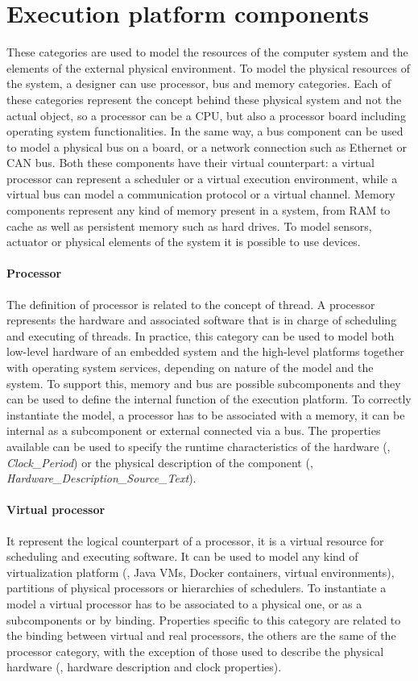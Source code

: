 \section{Execution platform components}
These categories are used to model the resources of the computer system and the elements of the external physical environment. To model the physical resources of the system, a designer can use processor,  bus and memory categories. Each of these categories represent the concept behind these physical system and not the actual object, so a processor can be a CPU, but also a processor board including operating system functionalities. In the same way, a bus component can be used to model a physical bus on a board, or a network connection such as Ethernet or CAN bus. Both these components have their virtual counterpart: a virtual processor can represent a scheduler or a virtual execution environment, while a virtual bus can model a communication protocol or a virtual channel. Memory components represent any kind of memory present in a system, from RAM to cache as well as persistent memory such as hard drives. To model sensors, actuator or physical elements of the system it is possible to use devices.

\paragraph{Processor} The definition of processor is related to the concept of thread. A processor represents the hardware and associated software that is in charge of scheduling  and executing of threads. In practice, this category can be used to model both low-level hardware of an embedded system and the high-level platforms together with operating system services, depending on nature of the model and the system. To support this, memory and bus are possible subcomponents and they can be used to define the internal function of the execution platform. To correctly instantiate the model, a processor has to be associated with a memory, it can be internal as a subcomponent or external connected via a bus. The properties available can be used to specify the runtime characteristics of the hardware (\eg, \textit{Clock\_Period}) or the physical description of the component (\eg, \textit{Hardware\_Description\_Source\_Text}).

\paragraph{Virtual processor} It represent the logical counterpart of a processor, it is a virtual resource for scheduling and executing software. It can be used to model any kind of virtualization platform (\eg, Java VMs, Docker containers, virtual environments), partitions of physical processors or hierarchies of schedulers. To instantiate a model a virtual processor has to be associated to a physical one, or as a subcomponents or by binding. Properties specific to this category are related to the binding between virtual and real processors, the others are the same of the processor category, with the exception of those used to describe the physical hardware (\eg, hardware description and clock properties).

